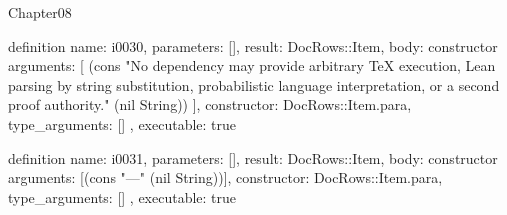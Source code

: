\begin{lexlean}{Chapter08}
\begin{semanticmodule}
definition{
  name: i0030,
  parameters: [],
  result: DocRows::Item,
  body: constructor{
    arguments: [
      (cons "No dependency may provide arbitrary TeX execution, Lean parsing by string substitution, probabilistic language interpretation, or a second proof authority." (nil String))
    ],
    constructor: DocRows::Item.para,
    type_arguments: []
  },
  executable: true
}

definition{
  name: i0031,
  parameters: [],
  result: DocRows::Item,
  body: constructor{
    arguments: [(cons "---" (nil String))],
    constructor: DocRows::Item.para,
    type_arguments: []
  },
  executable: true
}
\end{semanticmodule}
\end{lexlean}
